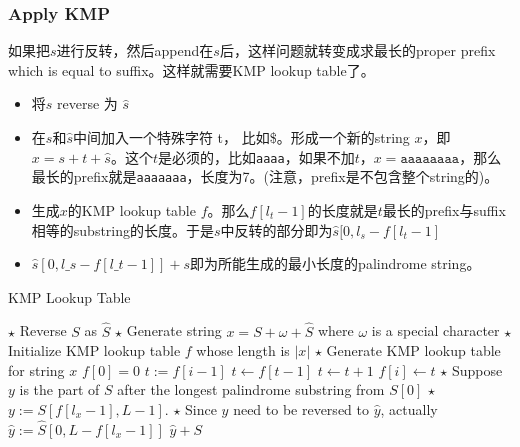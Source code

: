 \subsubsection{Apply KMP}
如果把$s$进行反转，然后append在$s$后，这样问题就转变成求最长的proper prefix which is equal to suffix。这样就需要KMP lookup table了。
\begin{itemize}
\item 将$s$ reverse 为 $\hat{s}$
\item 在$s$和$\hat{s}$中间加入一个特殊字符 t， 比如\$。形成一个新的string $x$，即$x=s+t+\hat{s}$。这个$t$是必须的，比如\texttt{aaaa}，如果不加$t$，$x=\texttt{aaaaaaaa}$，那么最长的prefix就是\texttt{aaaaaaa}，长度为7。(注意，prefix是不包含整个string的)。
\item 生成$x$的KMP lookup table $f$。那么$f[l_t-1]$的长度就是$t$最长的prefix与suffix相等的substring的长度。于是$s$中反转的部分即为$\hat{s}[0, l_s-f[l_t-1]$
\item $\hat{s}[0, l\_s-f[l\_t-1]] + s$即为所能生成的最小长度的palindrome string。
\end{itemize}
\setcounter{algorithm}{0}
\begin{algorithm}[H]
\caption{KMP Lookup Table}
\begin{algorithmic}[1]
\State $\star$ Reverse $S$ as $\hat{S}$
\State $\star$ Generate string $x=S + \omega + \hat{S}$ where $\omega$ is a special character
\State $\star$ Initialize KMP lookup table $f$ whose length is $|x|$
\State $\star$ Generate KMP lookup table for string $x$
\State $f[0]=0$
\State $t:=f[i-1]$
\State $t\gets f[t-1]$
\EndWhile
{}
\State $t\gets t+1$
\EndIf
\State $f[i]\gets t$
\EndFor
\State $\star$ Suppose $y$ is the part of $S$ after the longest palindrome substring from $S[0]$
\State $\star$ $y:=S[f[l_x-1], L-1]$.
\State $\star$ Since $y$ need to be reversed to $\hat{y}$, actually $\hat{y}:=\hat{S}[0, L - f[l_x-1]]$
\State \Return $\hat{y} + S$
\EndProcedure
\end{algorithmic}
\end{algorithm}
\setcounter{lstlisting}{0}
